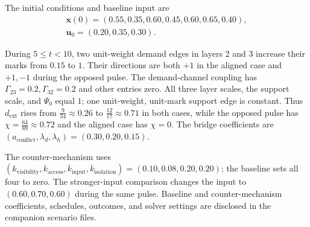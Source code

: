 
The initial conditions and baseline input are \begin{gather*}\bm{x}(0)=(0.55,0.35,0.60,0.45,0.60,0.65,0.40),\\ \bm{u}_0=(0.20,0.35,0.30).\end{gather*}

During $5\leq t<10$, two unit-weight demand edges in layers 2 and 3 increase their marks from $0.15$ to $1$. Their directions are both $+1$ in the aligned case and $+1,-1$ during the opposed pulse. The demand-channel coupling has $\Gamma_{23}=0.2, \Gamma_{32}=0.2$ and other entries zero. All three layer scales, the support scale, and $\Psi_0$ equal $1$; one unit-weight, unit-mark support edge is constant. Thus $d_{\mathrm{ext}}$ rises from $\frac{9}{34}\approx 0.26$ to $\frac{12}{17}\approx 0.71$ in both cases, while the opposed pulse has $\chi=\frac{64}{89}\approx 0.72$ and the aligned case has $\chi=0$. The bridge coefficients are $(a_{\mathrm{conflict}},\lambda_d,\lambda_h)=(0.30,0.20,0.15)$.

The counter-mechanism uses $(k_{\mathrm{visibility}},k_{\mathrm{access}},k_{\mathrm{input}},k_{\mathrm{isolation}})=(0.10,0.08,0.20,0.20)$; the baseline sets all four to zero. The stronger-input comparison changes the input to $(0.60,0.70,0.60)$ during the same pulse. Baseline and counter-mechanism coefficients, schedules, outcomes, and solver settings are disclosed in the companion scenario files.

